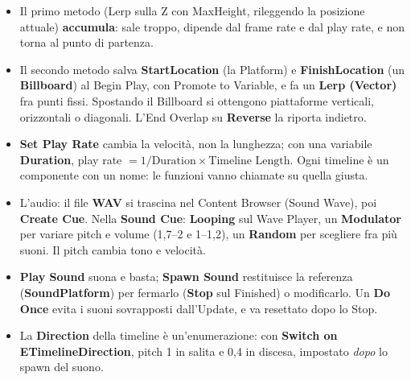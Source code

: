 \begin{itemize}
        \textbf{Lerp} dà la posizione.
  \item Il primo metodo (Lerp sulla Z con MaxHeight, rileggendo la posizione attuale)
        \textbf{accumula}: sale troppo, dipende dal frame rate e dal play rate, e non
        torna al punto di partenza.
  \item Il secondo metodo salva \textbf{StartLocation} (la Platform) e
        \textbf{FinishLocation} (un \textbf{Billboard}) al Begin Play, con Promote to
        Variable, e fa un \textbf{Lerp (Vector)} fra punti fissi. Spostando il Billboard
        si ottengono piattaforme verticali, orizzontali o diagonali. L'End Overlap su
        \textbf{Reverse} la riporta indietro.
  \item \textbf{Set Play Rate} cambia la velocità, non la lunghezza; con una variabile
        \textbf{Duration}, play rate $= 1/\text{Duration} \times \text{Timeline Length}$.
        Ogni timeline è un componente con un nome: le funzioni vanno chiamate su quella
        giusta.
  \item L'audio: il file \textbf{WAV} si trascina nel Content Browser (Sound Wave), poi
        \textbf{Create Cue}. Nella \textbf{Sound Cue}: \textbf{Looping} sul Wave Player,
        un \textbf{Modulator} per variare pitch e volume (1,7--2 e 1--1,2), un
        \textbf{Random} per scegliere fra più suoni. Il pitch cambia tono e velocità.
  \item \textbf{Play Sound} suona e basta; \textbf{Spawn Sound} restituisce la referenza
        (\textbf{SoundPlatform}) per fermarlo (\textbf{Stop} sul Finished) o modificarlo.
        Un \textbf{Do Once} evita i suoni sovrapposti dall'Update, e va resettato dopo lo
        Stop.
  \item La \textbf{Direction} della timeline è un'enumerazione: con \textbf{Switch on
        ETimelineDirection}, pitch 1 in salita e 0,4 in discesa, impostato \emph{dopo}
        lo spawn del suono.
\end{itemize}
